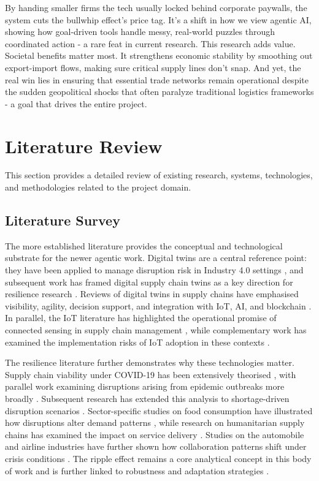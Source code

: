 By handing smaller firms the tech usually locked behind corporate paywalls, the system cuts the bullwhip effect's price tag. It's a shift in how we view agentic AI, showing how goal-driven tools handle messy, real-world puzzles through coordinated action - a rare feat in current research. This research adds value. Societal benefits matter most. It strengthens economic stability by smoothing out export-import flows, making sure critical supply lines don't snap. And yet, the real win lies in ensuring that essential trade networks remain operational despite the sudden geopolitical shocks that often paralyze traditional logistics frameworks - a goal that drives the entire project.

\section[Literature Review]{\textbf{Literature Review}}
This section provides a detailed review of existing research, systems, technologies, and
methodologies related to the project domain.
\subsection[Literature Survey]{\textbf{Literature Survey}}
The more established literature provides the conceptual and technological substrate for the newer agentic work. Digital twins are a central reference point: they have been applied to manage disruption risk in Industry 4.0 settings \cite{Ivanov2020}, and subsequent work has framed digital supply chain twins as a key direction for resilience research \cite{Nayal2022}. Reviews of digital twins in supply chains have emphasised visibility, agility, decision support, and integration with IoT, AI, and blockchain \cite{Nayal2022}. In parallel, the IoT literature has highlighted the operational promise of connected sensing in supply chain management \cite{Birkel2019}, while complementary work has examined the implementation risks of IoT adoption in these contexts \cite{BenDaya2019}.

The resilience literature further demonstrates why these technologies matter. Supply chain viability under COVID-19 has been extensively theorised \cite{Ivanov2021}, with parallel work examining disruptions arising from epidemic outbreaks more broadly \cite{Queiroz2020}. Subsequent research has extended this analysis to shortage-driven disruption scenarios \cite{Ivanov2022}. Sector-specific studies on food consumption have illustrated how disruptions alter demand patterns \cite{Chenarides2021}, while research on humanitarian supply chains has examined the impact on service delivery \cite{Paul2021}. Studies on the automobile and airline industries have further shown how collaboration patterns shift under crisis conditions \cite{Belhadi2021}. The ripple effect remains a core analytical concept in this body of work \cite{Dolgui2020} and is further linked to robustness and adaptation strategies \cite{Sodhi2021}.

